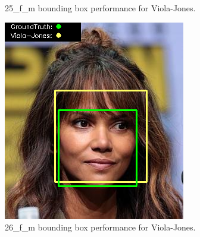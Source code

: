 \documentclass{l4proj}
\begin{document}
\begin{appendices}
\begin{figure}[h!]
\begin{minipage}{0.49\textwidth}
    \caption{25\_f\_m bounding box performance for Viola-Jones.}
    \label{whoopi_result}
  \end{minipage}
\end{figure}

\begin{figure}[h!]
  \centering
  \begin{minipage}{0.49\textwidth}
    \centering
     \includegraphics[width=\textwidth]{images/appendix/viola/26.png}
    \caption{26\_f\_m bounding box performance for Viola-Jones.}
    \label{whoopi_result}
  \end{minipage}
    \hfill
    \begin{minipage}{0.49\textwidth}
    \centering

\end{minipage}
\end{figure}
\end{appendices}
\end{document}
